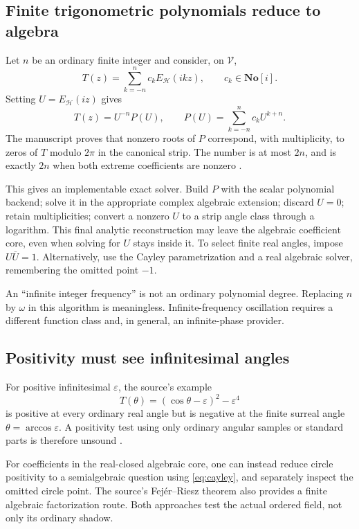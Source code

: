 \documentclass[11pt,letterpaper]{article}
\theoremstyle{definition}
\newcommand{\SC}{\mathbf{No}[i]}
\numberwithin{equation}{section}
\begin{document}
\subsection{Finite trigonometric polynomials reduce to algebra}
Let $n$ be an ordinary finite integer and consider, on $\mathscr V$,
\[
 T(z)=\sum_{k=-n}^n c_k E_{\mathscr H}(ikz),\qquad c_k\in\SC.
\]
Setting $U=E_{\mathscr H}(iz)$ gives
\begin{equation}\label{eq:trigalgebra}
 T(z)=U^{-n}P(U),\qquad
 P(U)=\sum_{k=-n}^n c_kU^{k+n}.
\end{equation}
The manuscript proves that nonzero roots of $P$ correspond, with multiplicity, to zeros of $T$ modulo $2\pi$ in the canonical strip. The number is at most $2n$, and is exactly $2n$ when both extreme coefficients are nonzero \cite[``Algebraization and the $2n$ root bound'']{SourceTrig}.

This gives an implementable exact solver. Build $P$ with the scalar polynomial backend; solve it in the appropriate complex algebraic extension; discard $U=0$; retain multiplicities; convert a nonzero $U$ to a strip angle class through a logarithm. This final analytic reconstruction may leave the algebraic coefficient core, even when solving for $U$ stays inside it. To select finite real angles, impose $U\overline U=1$. Alternatively, use the Cayley parametrization and a real algebraic solver, remembering the omitted point $-1$.

An ``infinite integer frequency'' is not an ordinary polynomial degree. Replacing $n$ by $\omega$ in this algorithm is meaningless. Infinite-frequency oscillation requires a different function class and, in general, an infinite-phase provider.

\subsection{Positivity must see infinitesimal angles}
For positive infinitesimal $\varepsilon$, the source's example
\[
 T(\theta)=(\cos\theta-\varepsilon)^2-\varepsilon^4
\]
is positive at every ordinary real angle but is negative at the finite surreal angle $\theta=\arccos\varepsilon$. A positivity test using only ordinary angular samples or standard parts is therefore unsound \cite[``Ordinary-angle testing misses infinitesimal negativity'']{SourceTrig}.

For coefficients in the real-closed algebraic core, one can instead reduce circle positivity to a semialgebraic question using \eqref{eq:cayley}, and separately inspect the omitted circle point. The source's Fej\'er--Riesz theorem also provides a finite algebraic factorization route. Both approaches test the actual ordered field, not only its ordinary shadow.
\end{document}
